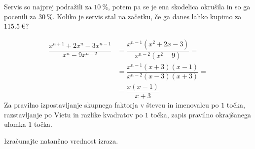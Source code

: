 \documentclass[addpoints]{exam}
\begin{document}
\begin{questions}


        \question[3]
        Servis so najprej podražili za $10~\%$, potem pa se je ena skodelica okrušila in so
        ga pocenili za $30~\%$. Koliko je servis stal na začetku, če ga danes lahko kupimo za $115.5~\euro$?

        \begin{solution}[6cm]
            \begin{align*}
                \dfrac{x^{n+1}+2x^n-3x^{n-1}}{x^n-9x^{n-2}} &= \dfrac{x^{n-1}(x^{2}+2x-3)}{x^{n-2}(x^2-9)}= \\
                                                            &= \dfrac{x^{n-1}(x+3)(x-1)}{x^{n-2}(x-3)(x+3)}= \\
                                                            &= \dfrac{x(x-1)}{x+3}
            \end{align*}
            Za pravilno izpostavljanje skupnega faktorja v števcu in imenovalcu po $1$ točka, razstavljanje po Vietu in razlike kvadratov po $1$ točka, zapis pravilno okrajšanega ulomka $1$ točka.
        \end{solution}

\newpage
    \question
    Izračunajte natančno vrednost izraza.
\end{questions}
\end{document}
